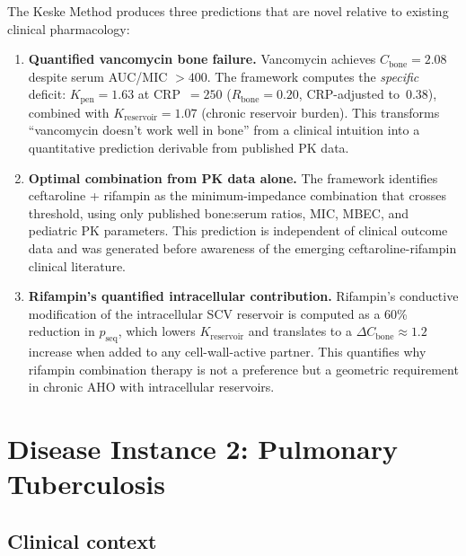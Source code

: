 \documentclass[11pt]{article}
\theoremstyle{plain}
\theoremstyle{definition}
\newcommand{\Kres}{K_{\mathrm{reservoir}}}
\begin{document}
The Keske Method produces three predictions that are novel relative
to existing clinical pharmacology:
\begin{enumerate}
  \item \textbf{Quantified vancomycin bone failure.}
    Vancomycin achieves $C_{\mathrm{bone}} = 2.08$ despite serum
    AUC/MIC $> 400$. The framework computes the \emph{specific}
    deficit: $K_{\mathrm{pen}} = 1.63$ at CRP~$= 250$
    ($R_{\mathrm{bone}} = 0.20$, CRP-adjusted to~$0.38$),
    combined with $\Kres = 1.07$ (chronic reservoir burden).
    This transforms ``vancomycin doesn't
    work well in bone'' from a clinical intuition into a
    quantitative prediction derivable from published PK data.

  \item \textbf{Optimal combination from PK data alone.}
    The framework identifies ceftaroline + rifampin as the
    minimum-impedance combination that crosses threshold, using
    only published bone:serum ratios, MIC, MBEC, and pediatric PK
    parameters. This prediction is independent of clinical outcome
    data and was generated before awareness of the emerging
    ceftaroline-rifampin clinical literature.

  \item \textbf{Rifampin's quantified intracellular contribution.}
    Rifampin's conductive modification of the intracellular SCV
    reservoir is computed as a 60\% reduction in $p_{\mathrm{seq}}$,
    which lowers $\Kres$ and translates to a
    $\Delta C_{\mathrm{bone}} \approx 1.2$
    increase when added to any cell-wall-active partner. This
    quantifies why rifampin combination therapy is not a preference
    but a geometric requirement in chronic AHO with intracellular
    reservoirs.
\end{enumerate}

\section{Disease Instance 2: Pulmonary Tuberculosis}
\label{sec:tb}

\subsection{Clinical context}
\label{sec:tb-context}
\end{document}
